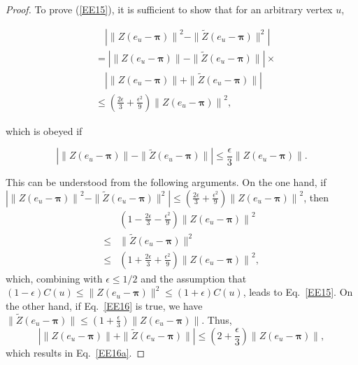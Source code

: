 \documentclass[sigconf]{acmart}
\def\abs#1{\left|#1  \right|}
\def\norm#1{\left\| #1 \right\|}
\newcommand\ppi{\boldsymbol{\pi}}
\newcommand\ee{\boldsymbol{\mathit{e}}}
\newcommand\ZZtil{\boldsymbol{\mathit{\tilde{Z}}}}
\newcommand\ZZ{\boldsymbol{\mathit{Z}}}
\begin{document}
\begin{proof}
	To prove (\ref{EE15}), it is sufficient  to show that for an arbitrary vertex $u$,
	\begin{small}
		\begin{align}\label{EE16a}
			 & \quad \abs{\norm{\ZZ(\ee_u-\ppi)}^2-\|{\ZZtil(\ee_u-\ppi)}\|^2}\nonumber \\
			 & =
			\abs{\norm{\ZZ(\ee_u-\ppi)}-\|\ZZtil(\ee_u-\ppi)\|}\times \nonumber         \\
			 & \quad\abs{\norm{\ZZ(\ee_u-\ppi)}+\|\ZZtil(\ee_u-\ppi)\|} \nonumber       \\
			 & \le
			\left(\frac{2\epsilon}{3}+\frac{\epsilon^2}{9}\right)\norm{\ZZ(\ee_u-\ppi)}^2,
		\end{align}
	\end{small}
	which is obeyed if
	\begin{small}
		\begin{equation}\label{EE16}
			\abs{\norm{\ZZ(\ee_u-\ppi)}-\|\ZZtil(\ee_u-\ppi)\|} \le
			\frac{\epsilon}{3}\norm{\ZZ(\ee_u-\ppi)}.
		\end{equation}
	\end{small}
	This can be understood from the following arguments. On the one hand, if
	{\footnotesize $\abs{\norm{\ZZ(\ee_u-\ppi)}^2-\|{\ZZtil(\ee_u-\ppi)}\|^2} \le \left(\frac{2\epsilon}{3}+\frac{\epsilon^2}{9}\right)\norm{\ZZ(\ee_u-\ppi)}^2$}, then
	\begin{align*}
		    & \left(1-\frac{2\epsilon}{3}-\frac{\epsilon^2}{9}\right)\norm{\ZZ(\ee_u-\ppi)}^2  \\
		\le & \|{\ZZtil(\ee_u-\ppi)}\|^2                                                       \\
		\le & \left(1+\frac{2\epsilon}{3}+\frac{\epsilon^2}{9}\right)\norm{\ZZ(\ee_u-\ppi)}^2,
	\end{align*}
	which, combining with $\epsilon \le 1/2$ and the assumption that $(1-\epsilon) C(u)\leq\|\ZZ (\ee_{u} - \ppi)\|^{2}\leq(1+\epsilon)  C(u)$, leads to Eq.~\eqref{EE15}.
	On the other hand, if Eq.~\eqref{EE16} is true, we have $\|\ZZtil(\ee_u-\ppi)\| \le (1+\frac{\epsilon}{3})\norm{\ZZ(\ee_u-\ppi)}$. Thus,
	\begin{equation*}
		\abs{\norm{\ZZ(\ee_u-\ppi)}+\|\ZZtil(\ee_u-\ppi)\|} \le (2+\frac{\epsilon}{3})\norm{\ZZ(\ee_u-\ppi)},
	\end{equation*}
	which results in Eq.~\eqref{EE16a}.


\end{proof}
\end{document}
